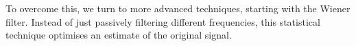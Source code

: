 \documentclass[paper-main.tex]{subfiles}
\begin{document}
To overcome this, we turn to more advanced techniques, starting with the Wiener filter. Instead of just passively filtering different frequencies, this statistical technique optimises an estimate of the original signal. 





\end{document}
